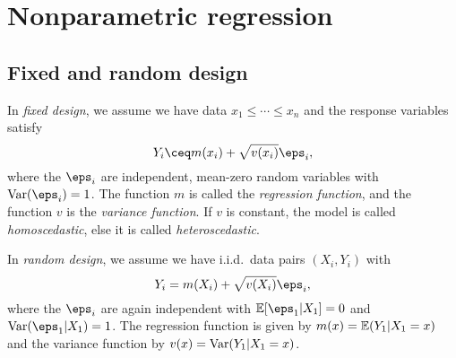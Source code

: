 \section{Nonparametric regression}
\subsection{Fixed and random design}
In \emph{fixed design}, we assume we have data $x_1 \leq \dotsb \leq x_n$ and the response variables satisfy 
\[
Y_i \ceq m(x_i) + \sqrt{v(x_i)} \eps_i,
\]
where the $\eps_i$ are independent, mean-zero random variables with $\Var(\eps_i) = 1$. The function $m$ is called the \emph{regression function}, and the function $v$ is the \emph{variance function}. If $v$ is constant, the model is called \emph{homoscedastic}, else it is called \emph{heteroscedastic}. 

In \emph{random design}, we assume we have i.i.d.\ data pairs $(X_i, Y_i)$ with 
\[
Y_i = m(X_i) + \sqrt{v(X_i)} \eps_i, 
\]
where the $\eps_i$ are again independent with $\EE[\eps_1 | X_1] = 0$ and $\Var(\eps_1 | X_1) = 1$. The regression function is given by $m(x) = \mathbb E(Y_1 | X_1 = x)$ and the variance function by $v(x) = \operatorname{Var}(Y_1 | X_1 = x)$. 